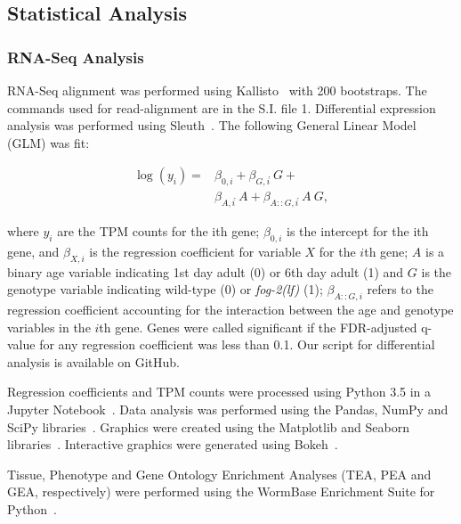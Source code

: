 \documentclass[9pt,twocolumn,twoside]{gsajnl}
\newcommand{\fog}{\emph{\mbox{fog-2(lf)}}}
\begin{document}
\subsection{Statistical Analysis}
\label{sb:statistics}

\subsubsection*{RNA-Seq Analysis}
RNA-Seq alignment was performed using Kallisto~\citep{Bray2016} with 200
bootstraps. The commands used for read-alignment are in the S.I. file 1.
Differential expression analysis was performed using Sleuth~\citep{Pimentel2016}.
The following General Linear Model (GLM) was fit:

\begin{align*}
  \log(y_i) =& \beta_{0,i} + \beta_{G,i}\dot~G + \\
  &\beta_{A,i}\dot~A + \beta_{A::G,i}\dot~A~G,
  \label{eqn:GLM}
\end{align*}

where $y_i$ are the TPM counts for the ith gene; $\beta_{0,i}$ is the intercept
for the ith gene, and $\beta_{X,i}$ is the regression coefficient for variable
$X$ for the $i$th gene; $A$ is a binary age variable indicating 1st day adult
(0) or 6th day adult (1) and $G$ is the genotype variable indicating wild-type
(0) or \fog{} (1); $\beta_{A::G, i}$ refers to the regression coefficient
accounting for the interaction between the age and genotype variables in the
$i$th gene. Genes were called significant if the FDR-adjusted q-value for any
regression coefficient was less than 0.1. Our script for differential analysis
is available on GitHub.

Regression coefficients and TPM counts were processed using Python 3.5 in a
Jupyter Notebook~\citep{Perez2007}. Data analysis was performed using the Pandas,
NumPy and SciPy libraries~\citep{McKinney2011,VanDerWalt2011,Oliphant2007}.
Graphics were created using the Matplotlib and Seaborn
libraries~\citep{Waskom,Hunter2007}. Interactive graphics were generated using
Bokeh~\citep{Team2014}.

Tissue, Phenotype and Gene Ontology Enrichment
Analyses (TEA, PEA and GEA, respectively) were performed using the WormBase
Enrichment Suite for Python~\citep{Angeles-Albores2016,Angeles-Albores106369}.
\end{document}
